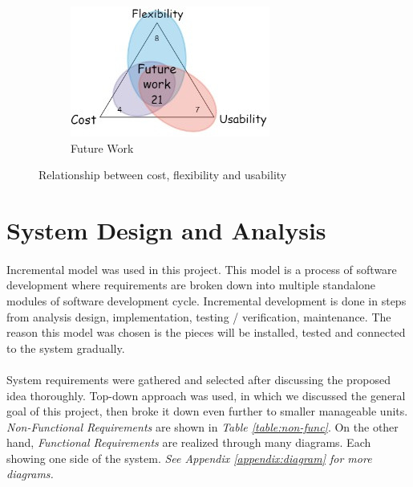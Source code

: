 \documentclass[12pt]{paper}
\begin{document}
\begin{figure}[H]
\begin{subfigure}[b]{.4\linewidth}
				\includegraphics[width=\linewidth]{img/future.jpg}
				\caption{Future Work}
			\end{subfigure}
			
			\caption{Relationship between cost, flexibility and usability}
			\label{fig:radar_diagram}
		\end{figure}
		
		\section{System Design and Analysis}
		\paragraph{} Incremental model was used in this project. This model is a process of software development where requirements are broken down into multiple standalone modules of software development cycle. Incremental development is done in steps from analysis design, implementation, testing / verification, maintenance\cite{sdlc}. The reason this model was chosen is the pieces will be installed, tested and connected to the system gradually.
		
		\paragraph{} System requirements were gathered and selected  after discussing the proposed idea thoroughly. Top-down approach was used, in which we discussed the general goal of this project, then broke it down even further to smaller manageable units. \textit{Non-Functional Requirements} are shown in \textit{Table \ref{table:non-func}}. On the other hand, \textit{Functional Requirements} are realized through many diagrams. Each showing one side of the system. \textit{See Appendix \ref{appendix:diagram} for more diagrams.}
		
\end{document}
